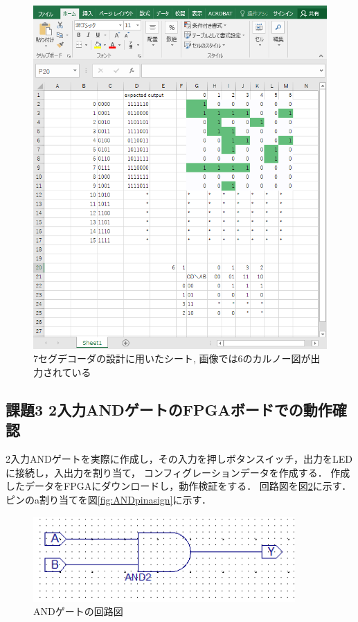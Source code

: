 \begin{figure}[tbp]
   \includegraphics[width=150mm,angle=0]{week2/pics/designingprocess.png}
   \caption{7セグデコーダの設計に用いたシート, 画像では6のカルノー図が出力されている} %
   \label{fig:7seg-dec-des} %
\end{figure}


\subsection{課題3 2入力ANDゲートのFPGAボードでの動作確認}
2入力ANDゲートを実際に作成し，その入力を押しボタンスイッチ，出力をLEDに接続し，入出力を割り当て，
コンフィグレーションデータを作成する．
作成したデータをFPGAにダウンロードし，動作検証をする．
回路図を図\ref{fig:ANDsch}に示す．ピンのa割り当てを図\ref{fig:ANDpinasign}に示す．

\begin{figure}[tbp]
  \includegraphics[width=100mm,angle=0]{week2/pics/ledswandsch.png}
  \centering
   \caption{ANDゲートの回路図} %
   \label{fig:ANDsch} %
\end{figure}


